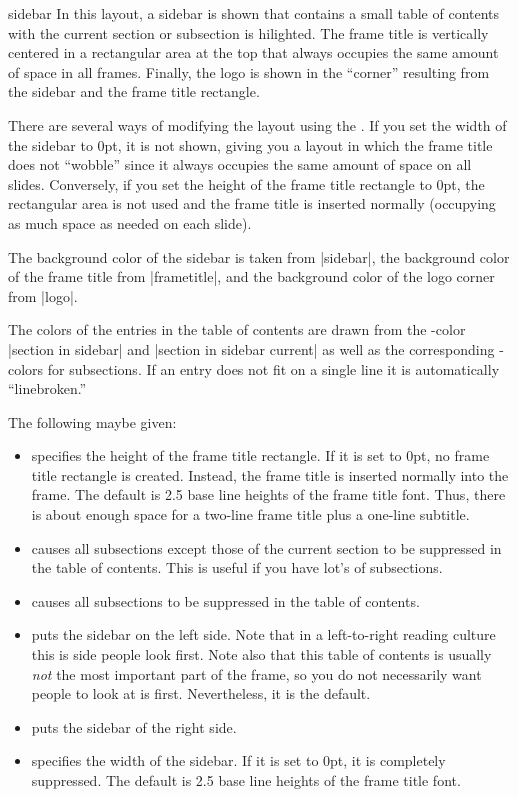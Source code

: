 \begin{outerthemeexample}{sidebar}
  In this layout, a sidebar is shown that contains a small table of
  contents with the current section or subsection is hilighted. The
  frame title is vertically centered in a rectangular area at the top
  that always occupies the same amount of space in all
  frames. Finally, the logo is shown in the ``corner'' resulting from
  the sidebar and the frame title rectangle.

  There are several ways of modifying the layout using the
  . If you set the width of the sidebar to 0pt, it is
  not shown, giving you a layout in which the frame title does not
  ``wobble'' since it always occupies the same amount of space on all
  slides. Conversely, if you set the height of the frame title
  rectangle to 0pt, the rectangular area is not used and the frame
  title is inserted normally (occupying as much space as needed on
  each slide).

  The background color of the sidebar is taken from |sidebar|, the
  background color of the frame title from |frametitle|, and the
  background color of the logo corner from |logo|.

  The colors of the entries in the table of contents are drawn from
  the \beamer-color |section in sidebar| and |section in sidebar current| as well as the
  corresponding \beamer-colors for subsections. If an entry does not
  fit on a single line it is automatically ``linebroken.'' 

  The following  maybe given:
  \begin{itemize}
  \item
     specifies the height of the
    frame title rectangle. If it is set to 0pt, no frame title
    rectangle is created. Instead, the frame title is inserted
    normally into the frame. The default is 2.5 base line heights of
    the frame title font. Thus, there is about enough space for a
    two-line frame title plus a one-line subtitle.
  \item
     causes all subsections except
    those of the current section to be suppressed in the table of
    contents. This is useful if you have lot's of subsections.
  \item
     causes all subsections to be
    suppressed in the table of contents.
  \item
     puts the sidebar on the left side. Note that in a
    left-to-right reading culture this is side people look first. Note
    also that this table of contents is usually \emph{not} the most
    important part of the frame, so you do not necessarily want people
    to look at is first. Nevertheless, it is the default.
  \item
     puts the sidebar of the right side.
  \item
     specifies the width of the
    sidebar. If it is set to 0pt, it is completely suppressed. The
    default is 2.5 base line heights of the frame title font.
  \end{itemize}
\end{outerthemeexample}

